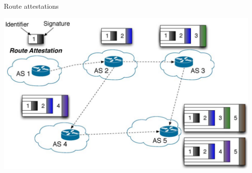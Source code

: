 \documentclass[notes=hide,yellow]{beamer}
\begin{document}
%
%
%
\begin{frame}{Route attestations}
			\begin{center}
				\includegraphics[scale=1.337]{sbgp.png}
			\end{center}
\end{frame}
%
%
%
%
%
%
\end{document}
